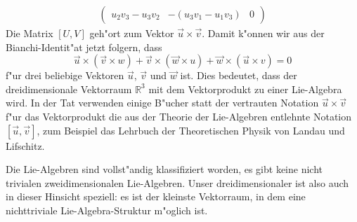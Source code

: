 \begin{beispiel}
\begin{align*}
\begin{pmatrix}
u_2v_3 - u_3v_2         
	&-( u_3v_1 - u_1v_3)
		& 0
\end{pmatrix}
\end{align*}
Die Matrix $[U,V]$ geh"ort zum Vektor $\vec u\times\vec v$.
Damit k"onnen wir aus der Bianchi-Identit"at jetzt folgern, dass
\[
\vec u\times(\vec v\times w)
+
\vec v\times(\vec w\times u)
+
\vec w\times(\vec u\times v)
=0
\]
f"ur drei beliebige Vektoren $\vec u$, $\vec v$ und $\vec w$ ist.
Dies bedeutet, dass der dreidimensionale Vektorraum $\mathbb R^3$
mit dem Vektorprodukt zu einer Lie-Algebra wird.
In der Tat verwenden einige B"ucher statt der vertrauten Notation
$\vec u\times \vec v$ f"ur das Vektorprodukt die aus der Theorie der
Lie-Algebren entlehnte Notation $[\vec u,\vec v]$, zum Beispiel
das Lehrbuch der Theoretischen Physik \cite{skript:landaulifschitz1}
von Landau und Lifschitz.

Die Lie-Algebren sind vollst"andig klassifiziert worden, es gibt
keine nicht trivialen zweidimensionalen Lie-Algebren.
Unser dreidimensionaler ist also auch in dieser Hinsicht speziell:
es ist der kleinste Vektorraum, in dem eine nichttriviale Lie-Algebra-Struktur
m"oglich ist.
\end{beispiel}

